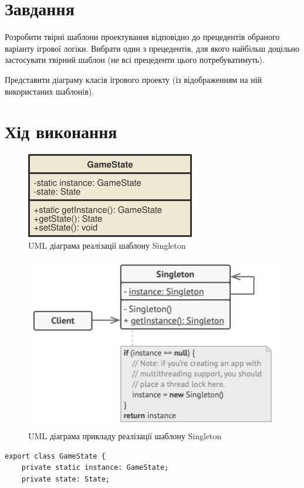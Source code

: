 \documentclass[oneside,14pt]{extarticle}
\begin{document}
\begin{normalsize}
	\section*{Завдання}
Розробити твірні шаблони проектування відповідно до прецедентів обраного варіанту
ігрової логіки. Вибрати один з прецедентів, для якого найбільш доцільно застосувати твірний
шаблон (не всі прецеденти цього потребуватимуть).

	Представити діаграму класів ігрового проекту (із відображенням на ній використаних
	шаблонів).

	\section*{Хід виконання}
	
	\begin{figure}[H]
		\centering
		\includegraphics[]{singleton}
		\caption{UML діаграма реалізації шаблону Singleton}
	\end{figure}
	
	\begin{figure}[H]
		\centering
		\includegraphics[]{singleton-ex}
		\caption{UML діаграма прикладу реалізації шаблону Singleton}
	\end{figure}
	
	\begin{small}
		\begin{lstlisting}
export class GameState {
	private static instance: GameState;
	private state: State;
	

\end{lstlisting}
\end{small}
\end{normalsize}
\end{document}
